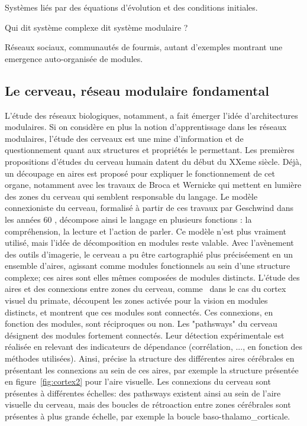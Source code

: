 Systèmes liés par des équations d'évolution et des conditions initiales. 

Qui dit système complexe dit système modulaire ?

Réseaux sociaux, communautés de fourmis, autant d'exemples montrant une emergence auto-organisée de modules. 

\subsection{Le cerveau, réseau modulaire fondamental}

L'étude des réseaux biologiques, notamment, a fait émerger l'idée d'architectures modulaires. Si on considère en plus la notion d'apprentissage dans les réseaux modulaires, l'étude des cerveaux est une mine d'information et de questionnement quant aux structures et propriétés le permettant. 
Les premières propositions d'études du cerveau humain datent du début du XXeme siècle. Déjà, un découpage en aires est proposé pour expliquer le fonctionnement de cet organe, notamment avec les travaux de Broca et Wernicke qui mettent en lumière des zones du cerveau qui semblent responsable du langage. Le modèle connexioniste du cerveau, formalisé à partir de ces travaux par Geschwind dans les années 60 , décompose ainsi le langage en plusieurs fonctions : la compréhension, la lecture et l'action de parler. Ce modèle n'est plus vraiment utilisé, mais l'idée de décomposition en modules reste valable.
Avec l'avènement des outils d'imagerie, le cerveau a pu être cartographié plus préciséement en un ensemble d'aires, agissant comme modules fonctionnels au sein d'une structure complexe; ces aires sont elles mêmes composées de modules distincts.
L'étude des aires et des connexions entre zones du cerveau, comme~\cite{primate_cortex_91} dans le cas du cortex visuel du primate, découpent les zones activée pour la vision en modules distincts, et montrent que ces modules sont connectés. Ces connexions, en fonction des modules, sont réciproques ou non. Les "pathsways" du cerveau désignent des modules fortement connectés. Leur détection expérimentale est réalisée en relevant des indicateurs de dépendance (corrélation, ..., en fonction des méthodes utilisées). Ainsi, \cite{Rolls2002ComputationalNO} précise la structure des différentes aires cérébrales en présentant les connexions au sein de ces aires, par exemple la structure présentée en figure~\ref{fig:cortex2} pour l'aire visuelle. 
Les connexions du cerveau sont présentes à différentes échelles: des pathsways existent ainsi au sein de l'aire visuelle du cerveau, mais des boucles de rétroaction entre zones cérébrales sont présentes à plus grande échelle, par exemple la boucle baso-thalamo_corticale. 


